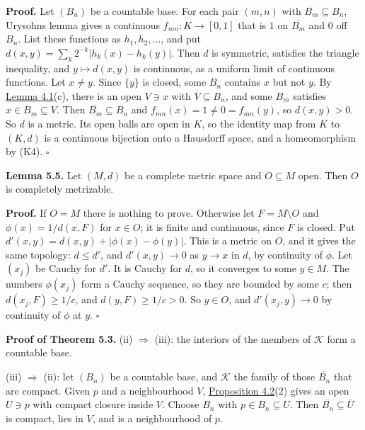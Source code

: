 \documentclass[
  english,
  11pt,
  a4paper,
]{article}
\begin{document}
\textbf{Proof.} Let \((B_n)\) be a countable base. For each pair
\((m,n)\) with \(\overline{B_m}\subseteq B_n\),
Urysohn\textquotesingle s lemma gives a continuous \(f_{mn}:K\to[0,1]\)
that is \(1\) on \(\overline{B_m}\) and \(0\) off \(B_n\). List these
functions as \(h_1,h_2,\ldots\), and put
\(d(x,y)=\sum_k2^{-k}|h_k(x)-h_k(y)|\). Then \(d\) is symmetric,
satisfies the triangle inequality, and \(y\mapsto d(x,y)\) is
continuous, as a uniform limit of continuous functions. Let \(x\neq y\).
Since \(\{y\}\) is closed, some \(B_n\) contains \(x\) but not \(y\). By
\hyperlink{the-stone-weierstrass-theorem-for-functions-vanishing-at-infinity--oa-fnd-sw-15}{Lemma
4.1}(c), there is an open \(V\ni x\) with \(\overline V\subseteq B_n\),
and some \(B_m\) satisfies \(x\in B_m\subseteq V\). Then
\(\overline{B_m}\subseteq B_n\) and \(f_{mn}(x)=1\neq0=f_{mn}(y)\), so
\(d(x,y)>0\). So \(d\) is a metric. Its open balls are open in \(K\), so
the identity map from \(K\) to \((K,d)\) is a continuous bijection onto
a Hausdorff space, and a homeomorphism by (K4). \(\square\)

\textbf{Lemma 5.5.} Let \((M,d)\) be a complete metric space and
\(O\subseteq M\) open. Then \(O\) is completely metrizable.

\textbf{Proof.} If \(O=M\) there is nothing to prove. Otherwise let
\(F=M\setminus O\) and \(\phi(x)=1/d(x,F)\) for \(x\in O\); it is finite
and continuous, since \(F\) is closed. Put
\(d'(x,y)=d(x,y)+|\phi(x)-\phi(y)|\). This is a metric on \(O\), and it
gives the same topology: \(d\leq d'\), and \(d'(x,y)\to0\) as \(y\to x\)
in \(d\), by continuity of \(\phi\). Let \((x_j)\) be Cauchy for \(d'\).
It is Cauchy for \(d\), so it converges to some \(y\in M\). The numbers
\(\phi(x_j)\) form a Cauchy sequence, so they are bounded by some \(c\);
then \(d(x_j,F)\geq1/c\), and \(d(y,F)\geq1/c>0\). So \(y\in O\), and
\(d'(x_j,y)\to0\) by continuity of \(\phi\) at \(y\). \(\square\)

\textbf{Proof of Theorem 5.3.} (ii) \(\Rightarrow\) (iii): the interiors
of the members of \(\mathcal K\) form a countable base.

(iii) \(\Rightarrow\) (ii): let \((B_n)\) be a countable base, and
\(\mathcal K\) the family of those \(\overline{B_n}\) that are compact.
Given \(p\) and a neighbourhood \(V\),
\hyperlink{the-stone-weierstrass-theorem-for-functions-vanishing-at-infinity--oa-fnd-sw-15}{Proposition
4.2}(2) gives an open \(U\ni p\) with compact closure inside \(V\).
Choose \(B_n\) with \(p\in B_n\subseteq U\). Then
\(\overline{B_n}\subseteq\overline U\) is compact, lies in \(V\), and is
a neighbourhood of \(p\).
\end{document}
